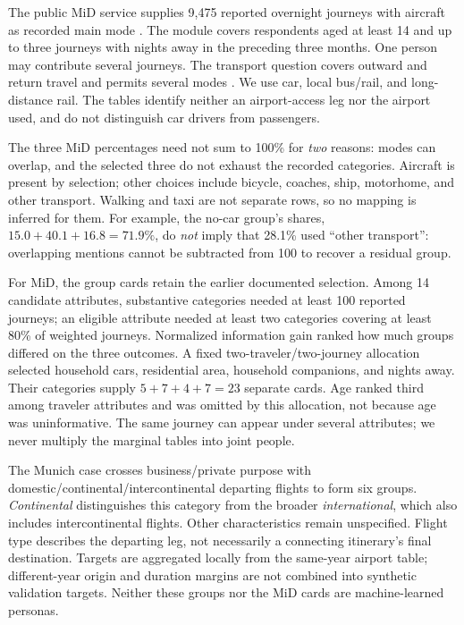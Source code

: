 \documentclass{article}
\begin{document}
The public MiD service supplies 9,475 reported overnight journeys with aircraft as recorded main mode \citep{mit2023}. The module covers respondents aged at least 14 and up to three journeys with nights away in the preceding three months. One person may contribute several journeys. The transport question covers outward and return travel and permits several modes \citep{midmethods2025,midhandbook2025,midquestionnaire2025}. We use car, local bus/rail, and long-distance rail. The tables identify neither an airport-access leg nor the airport used, and do not distinguish car drivers from passengers.

The three MiD percentages need not sum to 100\% for \emph{two} reasons: modes can overlap, and the selected three do not exhaust the recorded categories. Aircraft is present by selection; other choices include bicycle, coaches, ship, motorhome, and other transport. Walking and taxi are not separate rows, so no mapping is inferred for them. For example, the no-car group's shares, $15.0+40.1+16.8=71.9\%$, do \emph{not} imply that 28.1\% used ``other transport'': overlapping mentions cannot be subtracted from 100 to recover a residual group.

For MiD, the group cards retain the earlier documented selection. Among 14 candidate attributes, substantive categories needed at least 100 reported journeys; an eligible attribute needed at least two categories covering at least 80\% of weighted journeys. Normalized information gain ranked how much groups differed on the three outcomes. A fixed two-traveler/two-journey allocation selected household cars, residential area, household companions, and nights away. Their categories supply $5+7+4+7=23$ separate cards. Age ranked third among traveler attributes and was omitted by this allocation, not because age was uninformative. The same journey can appear under several attributes; we never multiply the marginal tables into joint people.

The Munich case crosses business/private purpose with domestic/continental/intercontinental departing flights to form six groups. \emph{Continental} distinguishes this category from the broader \emph{international}, which also includes intercontinental flights. Other characteristics remain unspecified. Flight type describes the departing leg, not necessarily a connecting itinerary's final destination. Targets are aggregated locally from the same-year airport table; different-year origin and duration margins are not combined into synthetic validation targets. Neither these groups nor the MiD cards are machine-learned personas.
\end{document}
